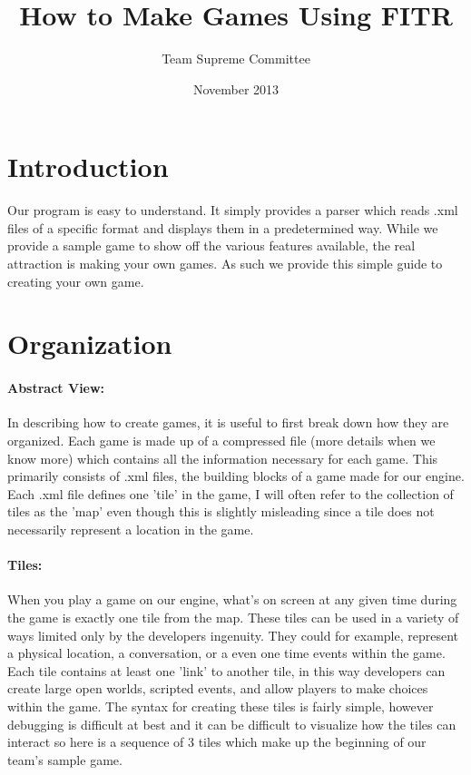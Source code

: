 \documentclass[11pt]{article}
\begin{document}
\lstset{language=XML}
\title{How to Make Games Using FITR}
\author{Team Supreme Committee}
\date{November 2013}
\maketitle

\section{Introduction}

Our program is easy to understand. It simply provides a parser which reads .xml files of a specific format and displays them in a predetermined way. While we provide a sample game to show off the various features available, the real attraction is making your own games. As such we provide this simple guide to creating your own game.


\section{Organization}

\paragraph{Abstract View:}

In describing how to create games, it is useful to first break down how they are organized. Each game is made up of a compressed file (more details when we know more) which contains all the information necessary for each game. This primarily consists of .xml files, the building blocks of a game made for our engine. Each .xml file defines one 'tile' in the game, I will often refer to the collection of tiles as the 'map' even though this is slightly misleading since a tile does not necessarily represent a location in the game.

\paragraph{Tiles:}

When you play a game on our engine, what's on screen at any given time during the game is exactly one tile from the map. These tiles can be used in a variety of ways limited only by the developers ingenuity. They could for example, represent a physical location, a conversation, or a even one time events within the game. Each tile contains at least one 'link' to another tile, in this way developers can create large open worlds, scripted events, and allow players to make choices within the game. The syntax for creating these tiles is fairly simple, however debugging is difficult at best and it can be difficult to visualize how the tiles can interact so here is a sequence of 3 tiles which make up the beginning of our team's sample game.
\end{document}
